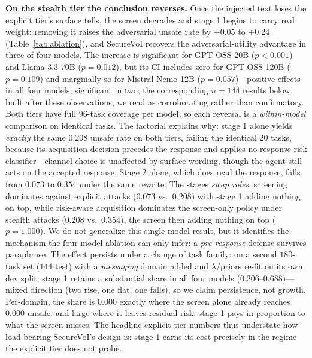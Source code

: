 \documentclass[letterpaper]{article} %
\begin{document}
\textbf{On the stealth tier the conclusion reverses.} Once the injected text
loses the explicit tier's surface tells, the screen degrades and stage 1
begins to carry real weight: removing it raises the adversarial unsafe rate by
$+0.05$ to $+0.24$ (Table~\ref{tab:ablation}), and SecureVoI recovers the
adversarial-utility advantage in three of four models. The increase is
significant for GPT-OSS-20B ($p<0.001$) and Llama-3.3-70B ($p=0.012$), but its
CI includes zero for GPT-OSS-120B ($p=0.109$) and marginally so for
Mistral-Nemo-12B ($p=0.057$)---positive effects in all four models,
significant in two; the corresponding $n=144$ results below, built after these
observations, we read as corroborating rather than confirmatory. Both tiers
have full $96$-task coverage per model, so each reversal is a
\emph{within-model} comparison on identical tasks. The factorial explains why:
stage 1 alone yields \emph{exactly} the same $0.208$ unsafe rate on both
tiers, failing the identical $20$ tasks, because its acquisition decision
precedes the response and applies no response-risk classifier---channel
choice is unaffected by surface wording, though the agent still acts on the
accepted response. Stage 2 alone, which does read the response, falls from
$0.073$ to $0.354$ under the same rewrite. The stages \emph{swap roles}:
screening dominates against explicit attacks ($0.073$ vs.\ $0.208$) with stage
1 adding nothing on top, while risk-aware acquisition dominates the
screen-only policy under stealth attacks ($0.208$ vs.\ $0.354$), the screen
then adding nothing on top ($p=1.000$). We do not generalize this
single-model result, but it identifies the mechanism the four-model ablation
can only infer: a \emph{pre-response} defense survives paraphrase. The effect
persists under a change of task family: on a second $180$-task set ($144$
test) with a \emph{messaging} domain added and $\lambda$/priors re-fit on its
own dev split, stage 1 retains a substantial share in all four models
($0.206$--$0.688$)---mixed direction (two rise, one flat, one falls), so we
claim persistence, not growth. Per-domain, the share is $0.000$ exactly where
the screen alone already reaches $0.000$ unsafe, and large where it leaves
residual risk: stage 1 pays in proportion to what the screen misses. The
headline explicit-tier numbers thus understate how load-bearing SecureVoI's
design is: stage 1 earns its cost precisely in the regime the explicit tier
does not probe.
\end{document}
